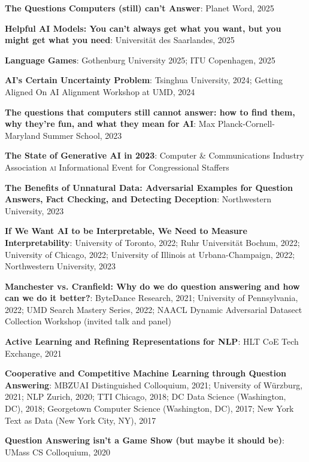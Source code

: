 {{  \begin{enumerate*}
  	\item {\bf The Questions Computers (still) can't Answer}: Planet Word, 2025
  	\item {\bf Helpful AI Models: You can't always get what you want, but you
  		might get what you need}: Universit\"at des Saarlandes, 2025
  	\item {\bf Language Games}: Gothenburg University 2025; ITU Copenhagen, 2025
    \item {\bf AI's Certain Uncertainty Problem}: Tsinghua University,
      2024; Getting Aligned On
      AI Alignment Workshop at UMD, 2024
    \item {\bf The questions that computers still cannot answer: how to find
    them, why they’re fun, and what they mean for AI}: Max
    Planck-Cornell-Maryland Summer School, 2023
    \item {\bf The State of Generative AI in 2023}: Computer \& Communications
    Industry Association \textsc{ai} Informational Event for Congressional Staffers
    \item {\bf The Benefits of Unnatural Data: Adversarial Examples for
Question Answers, Fact Checking, and Detecting Deception}: Northwestern
University, 2023
    \item {\bf If We Want AI to be Interpretable, We Need to Measure
        Interpretability}: University of Toronto, 2022; Ruhr
      Universit\"at Bochum, 2022; University of Chicago, 2022;
      University of Illinois at Urbana-Champaign, 2022; Northwestern
        University, 2023
    \item {\bf Manchester vs. Cranfield: Why do we do question answering and
how can we do it better?}: ByteDance Research, 2021; University of
Pennsylvania, 2022; UMD Search Mastery Series, 2022; NAACL Dynamic
Adversarial Datasect Collection Workshop (invited talk and panel)
    \item {\bf Active Learning and Refining Representations for NLP}:
      HLT CoE Tech Exchange, 2021
\item {\bf Cooperative and Competitive Machine Learning through
    Question Answering}: MBZUAI Distinguished Colloquium, 2021;
  University of W\"urzburg, 2021; NLP Zurich, 2020; TTI Chicago, 2018; DC Data Science (Washington, DC), 2018; Georgetown Computer Science (Washington, DC),
  2017; New York Text as Data (New York City, NY), 2017
  \item {\bf Question
      Answering isn't a Game Show (but maybe it should be)}: UMass CS
    Colloquium, 2020

\end{enumerate*}}}

